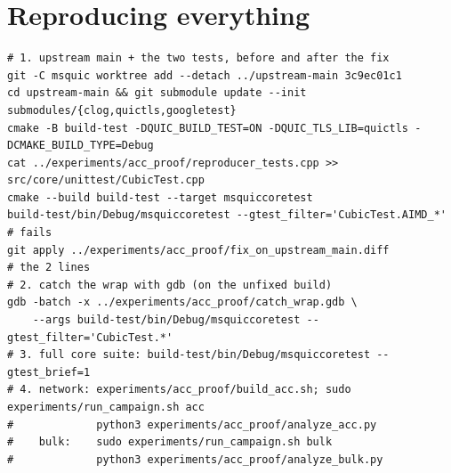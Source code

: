 \documentclass[11pt,a4paper]{article}
\begin{document}
\section{Reproducing everything}
\label{sec:repro}

\begin{lstlisting}
# 1. upstream main + the two tests, before and after the fix
git -C msquic worktree add --detach ../upstream-main 3c9ec01c1
cd upstream-main && git submodule update --init submodules/{clog,quictls,googletest}
cmake -B build-test -DQUIC_BUILD_TEST=ON -DQUIC_TLS_LIB=quictls -DCMAKE_BUILD_TYPE=Debug
cat ../experiments/acc_proof/reproducer_tests.cpp >> src/core/unittest/CubicTest.cpp
cmake --build build-test --target msquiccoretest
build-test/bin/Debug/msquiccoretest --gtest_filter='CubicTest.AIMD_*'      # fails
git apply ../experiments/acc_proof/fix_on_upstream_main.diff               # the 2 lines
# 2. catch the wrap with gdb (on the unfixed build)
gdb -batch -x ../experiments/acc_proof/catch_wrap.gdb \
    --args build-test/bin/Debug/msquiccoretest --gtest_filter='CubicTest.*'
# 3. full core suite: build-test/bin/Debug/msquiccoretest --gtest_brief=1
# 4. network: experiments/acc_proof/build_acc.sh; sudo experiments/run_campaign.sh acc
#             python3 experiments/acc_proof/analyze_acc.py
#    bulk:    sudo experiments/run_campaign.sh bulk
#             python3 experiments/acc_proof/analyze_bulk.py
\end{lstlisting}
\end{document}
